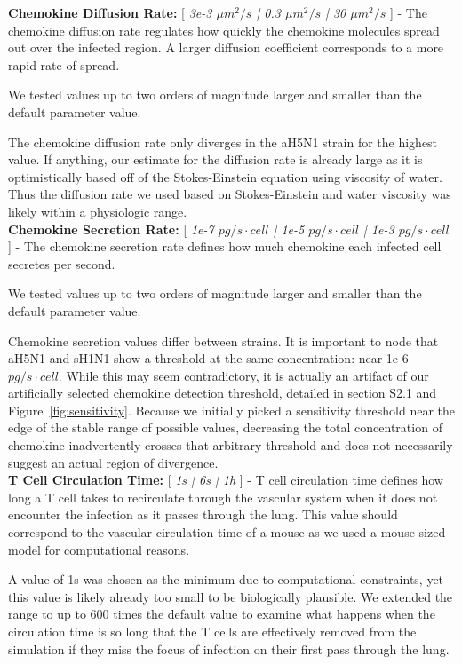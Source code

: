 \documentclass[10pt]{article}
\begin{document}
\textbf{Chemokine Diffusion Rate:}  [ \textit{3e-3 $\mu m^2/s$ | 0.3 $\mu m^2/s$ | 30 $\mu m^2/s$} ] - The chemokine diffusion rate regulates how quickly the chemokine molecules spread out over the infected region.  A larger diffusion coefficient corresponds to a more rapid rate of spread.

We tested values up to two orders of magnitude larger and smaller than the default parameter value.

The chemokine diffusion rate only diverges in the aH5N1 strain for the highest value.  If anything, our estimate for the diffusion rate is already large as it is optimistically based off of the Stokes-Einstein equation using viscosity of water.  Thus the diffusion rate we used based on Stokes-Einstein and water viscosity was likely within a physiologic range. \\


\textbf{Chemokine Secretion Rate:} [ \textit{1e-7 $pg/s\cdot cell$ |  1e-5 $pg/s\cdot cell$ | 1e-3 $pg/s\cdot cell$} ] - The chemokine secretion rate defines how much chemokine each infected cell secretes per second.

We tested values up to two orders of magnitude larger and smaller than the default parameter value.

Chemokine secretion values differ between strains.  It is important to node that aH5N1 and sH1N1 show a threshold at the same concentration: near 1e-6 $pg/s\cdot cell$.  While this may seem contradictory, it is actually an artifact of our artificially selected chemokine detection threshold, detailed in section S2.1 and Figure~\ref{fig:sensitivity}.  Because we initially picked a sensitivity threshold near the edge of the stable range of possible values, decreasing the total concentration of chemokine inadvertently crosses that arbitrary threshold and does not necessarily suggest an actual region of divergence. \\


\textbf{T Cell Circulation Time:} [ \textit{1s | 6s | 1h} ] - T cell circulation time defines how long a T cell takes to recirculate through the vascular system when it does not encounter the infection as it passes through the lung.  This value should correspond to the vascular circulation time of a mouse as we used a mouse-sized model for computational reasons.

A value of 1s was chosen as the minimum due to computational constraints, yet this value is likely already too small to be biologically plausible.  We extended the range to up to 600 times the default value to examine what happens when the circulation time is so long that the T cells are effectively removed from the simulation if they miss the focus of infection on their first pass through the lung.
\end{document}
